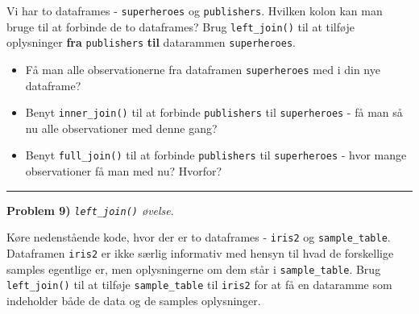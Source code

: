 \documentclass[
]{book}
\providecommand{\tightlist}{%
  \setlength{\itemsep}{0pt}\setlength{\parskip}{0pt}}
\begin{document}
Vi har to dataframes - \texttt{superheroes} og \texttt{publishers}. Hvilken kolon kan man bruge til at forbinde de to dataframes? Brug \texttt{left\_join()} til at tilføje oplysninger \textbf{fra} \texttt{publishers} \textbf{til} datarammen \texttt{superheroes}.

\begin{itemize}
\tightlist
\item
  Få man alle observationerne fra dataframen \texttt{superheroes} med i din nye dataframe?
\item
  Benyt \texttt{inner\_join()} til at forbinde \texttt{publishers} til \texttt{superheroes} - få man så nu alle observationer med denne gang?
\item
  Benyt \texttt{full\_join()} til at forbinde \texttt{publishers} til \texttt{superheroes} - hvor mange observationer få man med nu? Hvorfor?
\end{itemize}

\begin{center}\rule{0.5\linewidth}{0.5pt}\end{center}

\textbf{Problem 9)} \emph{\texttt{left\_join()} øvelse}.

Køre nedenstående kode, hvor der er to dataframes - \texttt{iris2} og \texttt{sample\_table}. Dataframen \texttt{iris2} er ikke særlig informativ med hensyn til hvad de forskellige samples egentlige er, men oplysningerne om dem står i \texttt{sample\_table}. Brug \texttt{left\_join()} til at tilføje \texttt{sample\_table} til \texttt{iris2} for at få en dataramme som indeholder både de data og de samples oplysninger.
\end{document}
